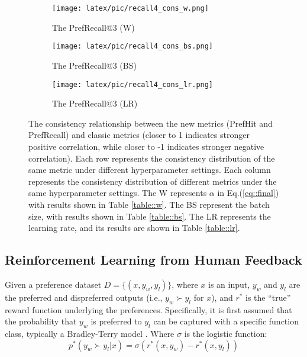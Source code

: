 \begin{figure*}[h]
  \medskip

  \begin{subfigure}{0.3\linewidth}
    \texttt{[image: latex/pic/recall4\_cons\_w.png]}
    \caption{The PrefRecall@3 (W)}
    \label{fig::recall4_cons_w}
  \end{subfigure}
  \begin{subfigure}{0.3\linewidth}
    \texttt{[image: latex/pic/recall4\_cons\_bs.png]}
    \caption{The PrefRecall@3 (BS)}
    \label{fig::recall4_cons_bs}
  \end{subfigure}
  \begin{subfigure}{0.3\linewidth}
    \texttt{[image: latex/pic/recall4\_cons\_lr.png]}
    \caption{The PrefRecall@3 (LR)}
    \label{fig::recall4_cons_lr}
  \end{subfigure}
  \caption{The consistency relationship between the new metrics (PrefHit and PrefRecall) and classic metrics (closer to 1 indicates stronger positive correlation, while closer to -1 indicates stronger negative correlation). Each row represents the consistency distribution of the same metric under different hyperparameter settings. Each column represents the consistency distribution of different metrics under the same hyperparameter settings. The W represents \(\alpha\) in Eq.(\ref{eq::final}) with results shown in Table \ref{table::w}. The BS represent the batch size, with results shown in Table \ref{table::bs}. The LR represents the learning rate, and its results are shown in Table \ref{table::lr}.}
  \label{fig:consistency}
\end{figure*}

\subsection{Reinforcement Learning from Human Feedback}
Given a preference dataset \( D = \{(x, y_w, y_l)\} \), where \( x \) is an input, \( y_w \) and \( y_l \) are the preferred and dispreferred outputs (i.e., \( y_w \succ y_l \) for \( x \)), and \( r^* \) is the “true” reward function underlying the preferences. 
Specifically, it is first assumed that the probability that \( y_w \) is preferred to \( y_l \) can be captured with a specific function class, typically a Bradley-Terry model \cite{bradley1952rank}. Where \( \sigma \) is the logistic function:
\begin{equation}
    p^*(y_w \succ y_l | x) = \sigma(r^*(x, y_w) - r^*(x, y_l)) 
\end{equation}

